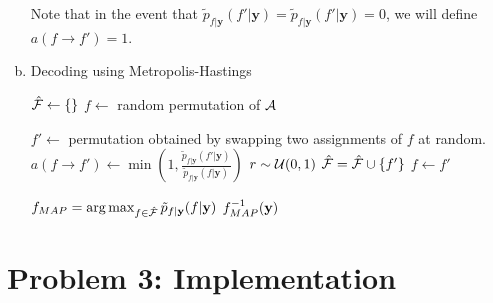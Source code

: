 \documentclass{siamart190516}
\begin{document}
\begin{enumerate}[(a)]
        Note that in the event that $\tilde{p}_{f | \textbf{y}}(f' | \textbf{y}) = \tilde{p}_{f | \textbf{y}}(f' | \textbf{y}) = 0$, we will define $a(f \rightarrow f') = 1$.

  \item
        \begin{algorithm*}
          \caption{Decoding using Metropolis-Hastings}
          \label{alg:decoding}
          \begin{algorithmic}
            \STATE $\hat{\mathcal{F}} \leftarrow \{\}$
            \STATE $f \leftarrow$ random permutation of $\mathcal{A}$

            \STATE $f' \leftarrow$ permutation obtained by swapping two assignments of $f$ at random.
            \STATE $a(f \rightarrow f') \leftarrow \min(1, \frac{\tilde{p}_{f | \textbf{y}}(f' | \textbf{y})}{\tilde{p}_{f | \textbf{y}}(f | \textbf{y})})$
            \STATE $r \sim \mathcal{U}(0, 1)$
            \STATE $\hat{\mathcal{F}} = \hat{\mathcal{F}} \cup \{ f' \}$
            \STATE $f \leftarrow f'$
            \ENDIF
            \ENDWHILE

            \STATE $f_{MAP} = \operatorname*{arg\,max}_{f \in \hat{\mathcal{F}}} \tilde{{p}}_{f | \textbf{y}}(f | \textbf{y})$
            \RETURN $f_{MAP}^{-1}(\textbf{y})$
          \end{algorithmic}
        \end{algorithm*}
\end{enumerate}

\section*{Problem 3: Implementation}
\label{sec:experiments}
\end{document}
